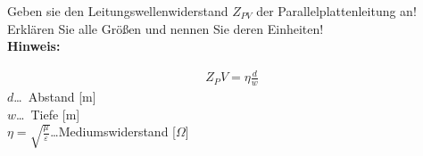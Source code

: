 \begin{question}[section=3,name={Wellenwiderstand},difficulty=,quantity=1,type=thr,tags={}]
	Geben sie den Leitungswellenwiderstand $Z_{PV}$ der Parallelplattenleitung an! Erklären Sie alle Größen und nennen Sie deren Einheiten!
	\\ \textbf{Hinweis:}\\
	
\end{question}
\begin{solution}
	\begin{align}
	Z_PV=\eta \frac{d}{w}
\end{align}
	$d$\dots\ Abstand [m]\\
	$w$\dots\ Tiefe [m]\\
	$\eta=\sqrt{\frac{\mu}{\varepsilon}}$\dots Mediumswiderstand [$\Omega$]
\end{solution}